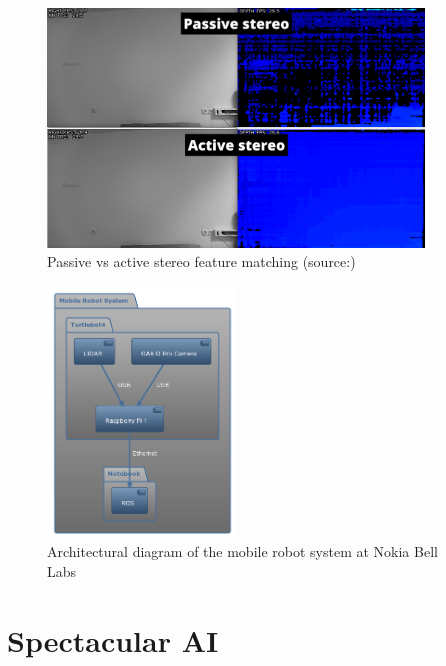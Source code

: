 \begin{figure}[htbp]
    \centering
    \includegraphics[width=100mm, keepaspectratio]{figures/active-vs-passive-stereo.png}
    \caption{Passive vs active stereo feature matching (source:\cite{ActivePassiveStereo})}
    \label{fig:active-passive-stereo}
\end{figure}

\begin{figure}[htbp]
    \centering
    \includegraphics[width=50mm, keepaspectratio]{figures/turtlebot4_architecture.png}
    \caption{Architectural diagram of the mobile robot system at Nokia Bell Labs}
    \label{fig:mobile_robot_architecture}
\end{figure}



\section{Spectacular AI}

